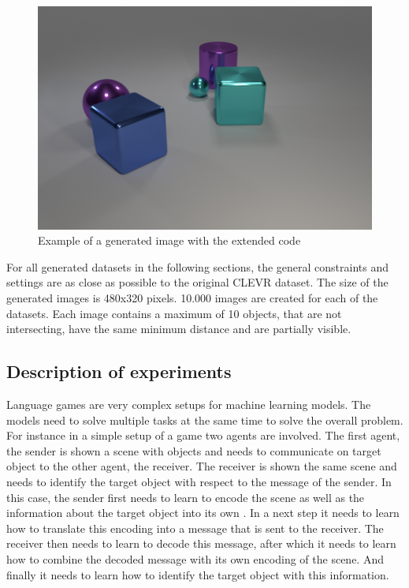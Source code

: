 \begin{figure}[h]
    \centering
    \includegraphics[width=.8\linewidth]{figures/CLEVR_extended_example.png}
    \caption{Example of a generated image with the extended code}
    \label{fig:clevr-extended_example}
\end{figure}

For all generated datasets in the following sections, the general constraints and settings are as close as possible to the original CLEVR dataset.
The size of the generated images is 480x320 pixels.
10.000 images are created for each of the datasets.
Each image contains a maximum of 10 objects, that are not intersecting, have the same minimum distance and are partially visible.

\subsection{Description of experiments}
Language games are very complex setups for machine learning models.
The models need to solve multiple tasks at the same time to solve the overall problem.
For instance in a simple setup of a game two agents are involved.
The first agent, the sender is shown a scene with objects and needs to communicate on target object to the other agent, the receiver.
The receiver is shown the same scene and needs to identify the target object with respect to the message of the sender.
In this case, the sender first needs to learn to encode the scene as well as the information about the target object into its own .
In a next step it needs to learn how to translate this encoding into a message that is sent to the receiver.
The receiver then needs to learn to decode this message, after which it needs to learn how to combine the decoded message with its own encoding of the scene.
And finally it needs to learn how to identify the target object with this information.

